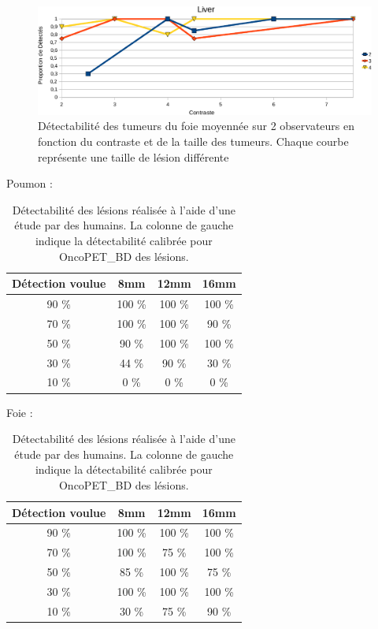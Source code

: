 \begin{figure}[h!]
\begin{center}
\includegraphics[width=15cm]{images/calibrationFoie_crop}
\end{center}
\caption[Détectabilité des tumeurs du foie en fonction du contraste et de la taille des tumeurs]{Détectabilité des tumeurs du foie moyennée sur 2 observateurs en fonction du contraste et de la taille des tumeurs. Chaque courbe représente une taille de lésion différente} 
\label{fig:calibrationFoie}
\end{figure}




\begin{table}
\centering
Poumon :\\
\begin{tabular}{|c|c|c|c|}
 \hline
 Détection voulue & 	8mm & 	12mm & 	16mm \\
\hline
90 \%		  & 100 \%  & 100 \% & 100 \% \\
\hline
70 \%		  & 100 \%  & 100 \% & 90 \%\\
\hline
50 \%		  & 90 \%  & 100 \% & 100 \%\\
\hline
30 \%		  & 44 \%  & 90 \% & 30 \%\\
\hline
10 \% 		  & 0 \%  & 0 \% & 0 \%\\
\hline
\end{tabular}

\vspace{0.5cm}

Foie :\\
\begin{tabular}{|c|c|c|c|}
 \hline
 Détection voulue & 	8mm & 	12mm & 	16mm \\
\hline
90 \%		  & 100 \%  & 100 \% & 100 \% \\
\hline
70 \%		  & 100 \%  & 75 \% & 100 \%\\
\hline
50 \%		  & 85 \%  & 100 \% & 75 \%\\
\hline
30 \%		  & 100 \%  & 100 \% & 100 \%\\
\hline
10 \% 		  & 30 \%  & 75 \% & 90 \%\\
\hline
\end{tabular}
\caption[Détectabilité estimée des lésions en fonction du contraste et de leur diamètre]{Détectabilité des lésions réalisée à l'aide d'une étude par des humains. La colonne de gauche indique la détectabilité calibrée pour OncoPET_BD des lésions.}
\label{fig:detectabiliteVue}
\end{table}

